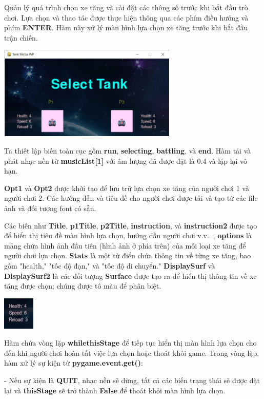 \documentclass[a4paper]{article}
\begin{document}
Quản lý quá trình chọn xe tăng và cài đặt các thông số trước khi bắt đầu
trò chơi. Lựa chọn và thao tác được thực hiện thông qua các phím điều
hướng và phím \textbf{ENTER}. Hàm này xử lý màn hình lựa chọn xe tăng
trước khi bắt đầu trận chiến.

\includegraphics[width=3.35833in,height=1.75in]{image32.png}

Ta thiết lập biến toàn cục gồm \textbf{run}, \textbf{selecting},
\textbf{battling}, và \textbf{end}. Hàm tải và phát nhạc nền từ
\textbf{musicList{[}1{]}} với âm lượng đã được đặt là 0.4 và lặp lại vô
hạn.

\textbf{Opt1} và \textbf{Opt2} được khởi tạo để lưu trữ lựa chọn xe tăng
của người chơi 1 và người chơi 2. Các hướng dẫn và tiêu đề cho người
chơi được tải và tạo từ các file ảnh và đối tượng font có sẵn.

Các biến như \textbf{Title}, \textbf{p1Title}, \textbf{p2Title},
\textbf{instruction}, và \textbf{instruction2} được tạo để hiển thị tiêu
đề màn hình lựa chọn, hướng dẫn người chơi v.v..., \textbf{options} là
mảng chứa hình ảnh đầu tiên (hình ảnh ở phía trên) của mỗi loại xe tăng
để người chơi lựa chọn. \textbf{Stats} là một từ điển chứa thông tin về
từng xe tăng, bao gồm "health," "tốc độ đạn," và "tốc độ di chuyển."
\textbf{DisplaySurf} và \textbf{DisplaySurf2} là các đối tượng
\textbf{Surface} được tạo ra để hiển thị thông tin về xe tăng được chọn;
chúng được tô màu để phân biệt.

\includegraphics[width=0.59306in,height=0.61389in]{image33.png}

Hàm chứa vòng lặp \textbf{whilethisStage} để tiếp tục hiển thị màn hình
lựa chọn cho đến khi người chơi hoàn tất việc lựa chọn hoặc thoát khỏi
game. Trong vòng lặp, hàm xử lý sự kiện từ \textbf{pygame.event.get()}:

- Nếu sự kiện là \textbf{QUIT}, nhạc nền sẽ dừng, tất cả các biến trạng
thái sẽ được đặt lại và \textbf{thisStage} sẽ trở thành \textbf{False}
để thoát khỏi màn hình lựa chọn.
\end{document}
